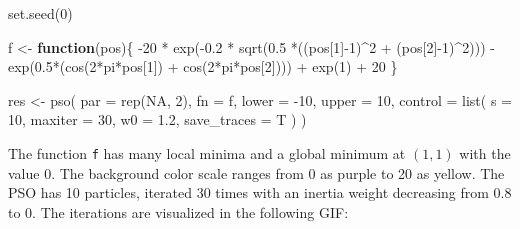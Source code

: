 \documentclass[
  oneside, a4paper, 12pt, openany]{book}
\newenvironment{Shaded}{\begin{snugshade}}{\end{snugshade}}
\newcommand{\AttributeTok}[1]{\textcolor[rgb]{0.77,0.63,0.00}{#1}}
\newcommand{\ConstantTok}[1]{\textcolor[rgb]{0.00,0.00,0.00}{#1}}
\newcommand{\ControlFlowTok}[1]{\textcolor[rgb]{0.13,0.29,0.53}{\textbf{#1}}}
\newcommand{\DecValTok}[1]{\textcolor[rgb]{0.00,0.00,0.81}{#1}}
\newcommand{\FloatTok}[1]{\textcolor[rgb]{0.00,0.00,0.81}{#1}}
\newcommand{\FunctionTok}[1]{\textcolor[rgb]{0.00,0.00,0.00}{#1}}
\newcommand{\NormalTok}[1]{#1}
\newcommand{\OtherTok}[1]{\textcolor[rgb]{0.56,0.35,0.01}{#1}}
\newcommand{\SpecialCharTok}[1]{\textcolor[rgb]{0.00,0.00,0.00}{#1}}
\theoremstyle{definition}
\theoremstyle{definition}
\theoremstyle{definition}
\theoremstyle{definition}
\theoremstyle{remark}
\begin{document}
\begin{Shaded}
\begin{Highlighting}[]
\FunctionTok{set.seed}\NormalTok{(}\DecValTok{0}\NormalTok{)}

\NormalTok{f }\OtherTok{\textless{}{-}} \ControlFlowTok{function}\NormalTok{(pos)\{}
  \SpecialCharTok{{-}}\DecValTok{20} \SpecialCharTok{*} \FunctionTok{exp}\NormalTok{(}\SpecialCharTok{{-}}\FloatTok{0.2} \SpecialCharTok{*} \FunctionTok{sqrt}\NormalTok{(}\FloatTok{0.5} \SpecialCharTok{*}\NormalTok{((pos[}\DecValTok{1}\NormalTok{]}\SpecialCharTok{{-}}\DecValTok{1}\NormalTok{)}\SpecialCharTok{\^{}}\DecValTok{2} \SpecialCharTok{+}\NormalTok{ (pos[}\DecValTok{2}\NormalTok{]}\SpecialCharTok{{-}}\DecValTok{1}\NormalTok{)}\SpecialCharTok{\^{}}\DecValTok{2}\NormalTok{))) }\SpecialCharTok{{-}} 
  \FunctionTok{exp}\NormalTok{(}\FloatTok{0.5}\SpecialCharTok{*}\NormalTok{(}\FunctionTok{cos}\NormalTok{(}\DecValTok{2}\SpecialCharTok{*}\NormalTok{pi}\SpecialCharTok{*}\NormalTok{pos[}\DecValTok{1}\NormalTok{]) }\SpecialCharTok{+} \FunctionTok{cos}\NormalTok{(}\DecValTok{2}\SpecialCharTok{*}\NormalTok{pi}\SpecialCharTok{*}\NormalTok{pos[}\DecValTok{2}\NormalTok{]))) }\SpecialCharTok{+} 
  \FunctionTok{exp}\NormalTok{(}\DecValTok{1}\NormalTok{) }\SpecialCharTok{+} \DecValTok{20}
\NormalTok{\}}

\NormalTok{res }\OtherTok{\textless{}{-}} \FunctionTok{pso}\NormalTok{(}
  \AttributeTok{par =} \FunctionTok{rep}\NormalTok{(}\ConstantTok{NA}\NormalTok{, }\DecValTok{2}\NormalTok{),}
  \AttributeTok{fn =}\NormalTok{ f,}
  \AttributeTok{lower =} \SpecialCharTok{{-}}\DecValTok{10}\NormalTok{,}
  \AttributeTok{upper =} \DecValTok{10}\NormalTok{,}
  \AttributeTok{control =} \FunctionTok{list}\NormalTok{(}
    \AttributeTok{s =} \DecValTok{10}\NormalTok{,}
    \AttributeTok{maxiter =} \DecValTok{30}\NormalTok{,}
    \AttributeTok{w0 =} \FloatTok{1.2}\NormalTok{,}
    \AttributeTok{save\_traces =}\NormalTok{ T}
\NormalTok{  )}
\NormalTok{)}
\end{Highlighting}
\end{Shaded}

\normalsize\vspace{0.1cm}

The function \texttt{f} has many local minima and a global minimum at \((1,1)\) with the value \(0\). The background color scale ranges from 0 as purple to 20 as yellow. The PSO has 10 particles, iterated 30 times with an inertia weight decreasing from 0.8 to 0. The iterations are visualized in the following GIF:
\end{document}
